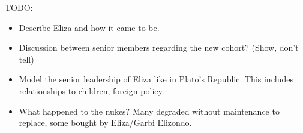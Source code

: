 TODO:

\begin{itemize}
\item Describe Eliza and how it came to be.
\item Discussion between senior members regarding the new cohort? (Show, don't tell)
\item Model the senior leadership of Eliza like in Plato's Republic. This includes relationships to children, foreign policy.
\item What happened to the nukes? Many degraded without maintenance to replace, some bought by Eliza/Garbi Elizondo.
\end{itemize}

\newpage
\thispagestyle{empty}
